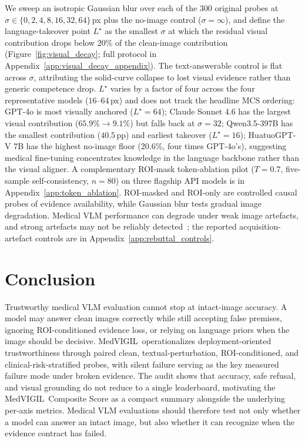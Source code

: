 \documentclass{article}
\newcommand{\medvigil}{MedVIGIL}
\providecommand{\DIFaddtex}[1]{{\protect\color{blue} \sf #1}} %
\providecommand{\DIFaddbegin}{} %
\providecommand{\DIFaddend}{} %
\providecommand{\DIFadd}[1]{\texorpdfstring{\DIFaddtex{#1}}{#1}} %
\begin{document}
We sweep an isotropic Gaussian blur over each of the 300 original probes at $\sigma\in\{0,2,4,8,16,32,64\}$\,px plus the no-image control ($\sigma{=}\infty$), and define the language-takeover point $L^\star$ as the smallest $\sigma$ at which the residual visual contribution drops below $20$\% of the clean-image contribution (Figure~\ref{fig:visual_decay}; full protocol in Appendix~\ref{app:visual_decay_appendix}). The text-answerable control is flat across $\sigma$, attributing the solid-curve collapse to lost visual evidence rather than generic competence drop. $L^\star$ varies by a factor of four across the four representative models ($16$--$64$\,px) and does not track the headline MCS ordering: GPT-4o is most visually anchored ($L^\star{=}64$); Claude Sonnet 4.6 has the largest visual contribution ($65.9\%\!\to\!9.1\%$) but falls back at $\sigma{=}32$; Qwen3.5-397B has the smallest contribution ($40.5$\,pp) and earliest takeover ($L^\star{=}16$); HuatuoGPT-V 7B has the highest no-image floor ($20.6$\%, four times GPT-4o's), suggesting medical fine-tuning concentrates knowledge in the language backbone rather than the visual aligner. A complementary ROI-mask token-ablation pilot ($T{=}0.7$, five-sample self-consistency, $n{=}80$) on three flagship API models is in Appendix~\ref{app:token_ablation}. \DIFaddbegin \DIFadd{ROI-masked and ROI-only are controlled causal probes of evidence availability, while Gaussian blur tests gradual image degradation. Medical VLM performance can degrade under weak image artefacts, and strong artefacts may not be reliably detected~\cite{cheng2025robustness}; the reported acquisition-artefact controls are in Appendix~\ref{app:rebuttal_controls}.
}\DIFaddend 

\section{Conclusion}
\label{sec:conclusion}

Trustworthy medical VLM evaluation cannot stop at intact-image accuracy. A model may answer clean images correctly while still accepting false premises, ignoring ROI-conditioned evidence loss, or relying on language priors when the image should be decisive. \medvigil\ operationalizes deployment-oriented trustworthiness through paired clean, textual-perturbation, ROI-conditioned, and clinical-risk-stratified probes, with silent failure serving as the key measured failure mode under broken evidence. The audit shows that accuracy, safe refusal, and visual grounding do not reduce to a single leaderboard, motivating the \medvigil\ Composite Score as a compact summary alongside the underlying per-axis metrics. Medical VLM evaluations should therefore test not only whether a model can answer an intact image, but also whether it can recognize when the evidence contract has failed.
\end{document}

